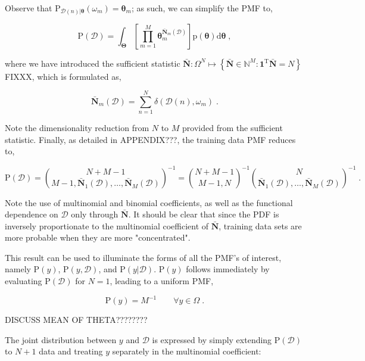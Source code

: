 \documentclass[12pt]{article}
\begin{document}
Observe that $\text{P}_{\mathcal{D}(n) | \bm{\theta}}(\omega_m) = \bm{\theta}_m$; as such, we can simplify the PMF to,

\begin{equation}
\text{P}(\mathcal{D}) = \int_{\bm{\Theta}} \left[ \prod_{m=1}^M \bm{\theta}_m^{\bar{\bm{N}}_m(\mathcal{D})} \right] \text{p}(\bm{\theta}) \mathrm{d}\bm{\theta} \;,
\end{equation}

where we have introduced the sufficient statistic $\bar{\bm{N}}: \Omega^N \mapsto \left\{ \bar{\bm{N}} \in \mathbb{N}^M: \bm{1}^\text{T}\bar{\bm{N}} = N \right\}$ FIXXX, which is formulated as,

\begin{equation}
\bar{\bm{N}}_m(\mathcal{D}) = \sum_{n=1}^N \delta(\mathcal{D}(n),\omega_m) \;.
\end{equation}

Note the dimensionality reduction from $N$ to $M$ provided from the sufficient statistic. Finally, as detailed in APPENDIX???, the training data PMF reduces to,

\begin{equation}
\text{P}(\mathcal{D}) = \binom{N+M-1}{M-1,\bar{\bm{N}}_1(\mathcal{D}),\ldots,\bar{\bm{N}}_M(\mathcal{D})}^{-1} 
= \binom{N+M-1}{M-1,N}^{-1} \binom{N}{\bar{\bm{N}}_1(\mathcal{D}),\ldots,\bar{\bm{N}}_M(\mathcal{D})}^{-1} \;.
\end{equation}

Note the use of multinomial and binomial coefficients, as well as the functional dependence on $\mathcal{D}$ only through $\bar{\bm{N}}$. It should be clear that since the PDF is inversely proportionate to the multinomial coefficient of $\bar{\bm{N}}$, training data sets are more probable when they are more "concentrated". 

This result can be used to illuminate the forms of all the PMF's of interest, namely $\text{P}(y)$, $\text{P}(y,\mathcal{D})$, and $\text{P}(y | \mathcal{D})$.  $\text{P}(y)$ follows immediately by evaluating $\text{P}(\mathcal{D})$ for $N=1$, leading to a uniform PMF,

\begin{equation}
\text{P}(y) = M^{-1} \qquad \forall y \in \Omega \;.
\end{equation}

DISCUSS MEAN OF THETA????????

The joint distribution between $y$ and $\mathcal{D}$ is expressed by simply extending $\text{P}(\mathcal{D})$ to $N+1$ data and treating $y$ separately in the multinomial coefficient:
\end{document}
